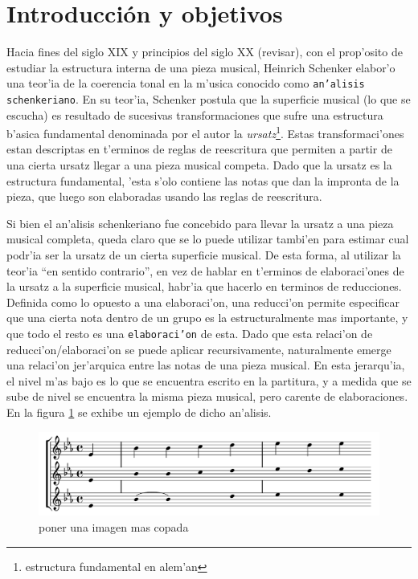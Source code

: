 \section{Introducci\'on y objetivos}
Hacia fines del siglo XIX y principios del siglo XX (\alert{revisar}), con el prop'osito de estudiar la estructura interna de una pieza musical, 
Heinrich Schenker elabor'o una teor'ia de la coerencia tonal en la m'usica conocido como \texttt{an'alisis schenkeriano}.
En su teor'ia, Schenker postula que la superficie musical (lo que se escucha) es resultado de sucesivas transformaciones que sufre una estructura b'asica fundamental 
denominada por el autor la \emph{ursatz}\footnote{estructura fundamental en alem'an}. Estas transformaci'ones estan descriptas en t'erminos de reglas de reescritura que permiten 
a partir de una cierta ursatz llegar a una pieza musical competa. Dado que la ursatz es la estructura fundamental, 'esta s'olo contiene las notas que dan la impronta de la pieza, 
que luego son elaboradas usando las reglas de reescritura.

Si bien el an'alisis schenkeriano fue concebido para llevar la ursatz a una pieza musical completa, queda claro que se lo puede utilizar tambi'en para estimar
cual podr'ia ser la ursatz de un cierta superficie musical. De esta forma, al utilizar la teor'ia ``en sentido contrario'', en vez de hablar en t'erminos de elaboraci'ones de 
la ursatz a la superficie musical, habr'ia que hacerlo en terminos de reducciones. Definida como lo opuesto a una elaboraci'on, una reducci'on permite especificar que una cierta 
nota dentro de un grupo es la estructuralmente mas importante, y que todo el resto es una \texttt{elaboraci'on} de esta. 
Dado que esta relaci'on de reducci'on/elaboraci'on se puede aplicar recursivamente, naturalmente emerge una relaci'on 
jer'arquica entre las notas de una pieza musical.  En esta jerarqu'ia, el nivel m'as bajo es lo que se encuentra escrito en la partitura, y a medida que se sube de nivel se 
encuentra la misma pieza musical, pero carente de elaboraciones. En la figura \ref{fig_analisis_schenkeriano} se exhibe un ejemplo de dicho an'alisis.


\begin{figure}[h]
\begin{center}
\includegraphics[width=12cm]{images/schenkerian_example}
\label{fig_analisis_schenkeriano}
\newline \alert{poner una imagen mas copada}
\end{center}
\end{figure}

